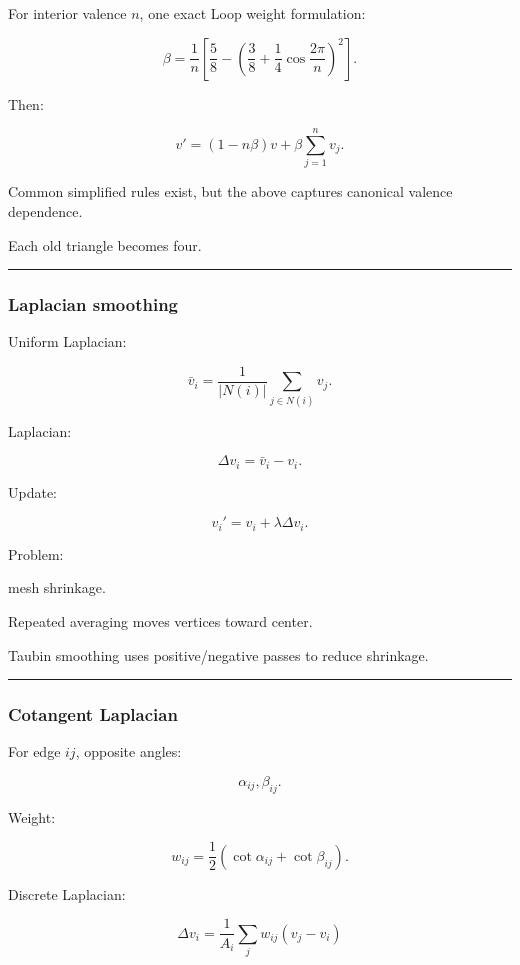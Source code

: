 For interior valence \(n\), one exact Loop weight formulation:

\[
\beta
=
\frac1n
\left[
\frac58-
\left(
\frac38+
\frac14\cos\frac{2\pi}{n}
\right)^2
\right].
\]

Then:

\[
\boxed{
v'
=
(1-n\beta)v
+
\beta
\sum_{j=1}^{n}v_j.
}
\]

Common simplified rules exist, but the above captures canonical valence dependence.

Each old triangle becomes four.

\begin{center}\rule{0.5\linewidth}{0.5pt}\end{center}

\subsubsection{Laplacian smoothing}\label{laplacian-smoothing}

Uniform Laplacian:

\[
\bar v_i=
\frac1{|N(i)|}
\sum_{j\in N(i)}
v_j.
\]

Laplacian:

\[
\Delta v_i=
\bar v_i-v_i.
\]

Update:

\[
\boxed{
v_i'
=
v_i+
\lambda\Delta v_i.
}
\]

Problem:

mesh shrinkage.

Repeated averaging moves vertices toward center.

Taubin smoothing uses positive/negative passes to reduce shrinkage.

\begin{center}\rule{0.5\linewidth}{0.5pt}\end{center}

\subsubsection{Cotangent Laplacian}\label{cotangent-laplacian}

For edge \(ij\), opposite angles:

\[
\alpha_{ij},\beta_{ij}.
\]

Weight:

\[
\boxed{
w_{ij}
=
\frac12
(
\cot\alpha_{ij}
+
\cot\beta_{ij}
).
}
\]

Discrete Laplacian:

\[
\Delta v_i
=
\frac1{A_i}
\sum_{j}
w_{ij}(v_j-v_i)
\]

